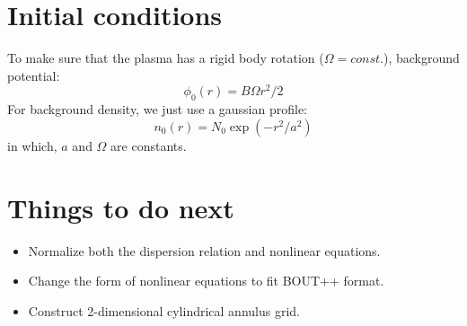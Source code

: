 \documentclass{article}
\begin{document}
\section{Initial conditions}
To make sure that the plasma has a rigid body rotation ($\Omega=const.$), background potential: 
\begin{equation}
\phi_0(r)=B\Omega r^2/2
\label{eq11}
\end{equation}
For background density, we just use a gaussian profile:
\begin{equation}
n_0(r)=N_0\exp(-r^2/a^2)
\label{eq12}
\end{equation}
in which, $a$ and $\Omega$ are constants. 
\section{Things to do next}
\begin{itemize}
\item Normalize both the dispersion relation and nonlinear equations.
\item Change the form of nonlinear equations to fit BOUT++ format.
\item Construct 2-dimensional cylindrical annulus grid.
\end{itemize}
\end{document}
